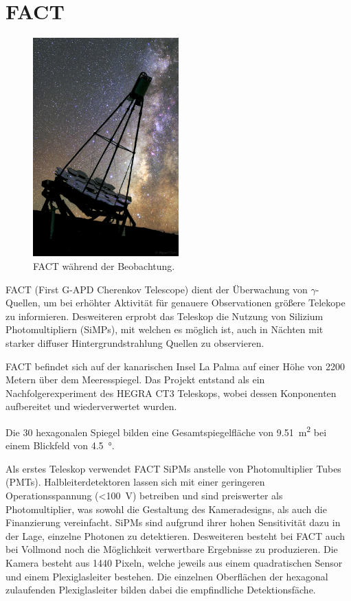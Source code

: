 \chapter{FACT}
\begin{figure}
  \includegraphics[width=0.50\textwidth]{./images/FACT.jpg}
  \caption{FACT während der Beobachtung.\cite{factpic}}
  \label{fig:observ}
\end{figure}
FACT (First G-APD Cherenkov Telescope) dient der Überwachung von $\gamma$-Quellen, um bei erhöhter Aktivität für genauere Observationen größere Telekope zu informieren. 
Desweiteren erprobt das Teleskop die Nutzung von Silizium Photomultipliern (SiMPs), mit welchen es möglich ist, auch in Nächten mit starker diffuser Hintergrundstrahlung Quellen zu observieren. 

FACT befindet sich auf der kanarischen Insel La Palma auf einer Höhe von 2200 Metern über dem Meeresspiegel.
Das Projekt entstand als ein Nachfolgerexperiment des HEGRA CT3 Teleskops, wobei dessen Konponenten aufbereitet und wiederverwertet wurden.

Die 30 hexagonalen Spiegel bilden eine Gesamtspiegelfläche von \SI{9.51}{\meter\squared} bei einem Blickfeld von \SI{4.5}{\degree}. 

Als erstes Teleskop verwendet FACT SiPMs anstelle von Photomultiplier Tubes (PMTs). 
Halbleiterdetektoren lassen sich mit einer geringeren Operationsspannung (\SI{<100}{\volt}) betreiben und sind preiswerter als Photomultiplier, was sowohl die Gestaltung des Kameradesigns, als auch die Finanzierung vereinfacht. 
SiPMs sind aufgrund ihrer hohen Sensitivität dazu in der Lage, einzelne Photonen zu detektieren. 
Desweiteren besteht bei FACT auch bei Vollmond noch die Möglichkeit verwertbare Ergebnisse zu produzieren.
Die Kamera besteht aus 1440 Pixeln, welche jeweils aus einem quadratischen Sensor und einem Plexiglasleiter bestehen. Die einzelnen Oberflächen der hexagonal zulaufenden Plexiglasleiter bilden dabei die empfindliche Detektionsfäche.

